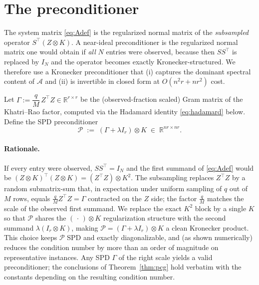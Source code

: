 \documentclass[12pt]{article}
\newcommand{\bR}{\mathbb{R}}
\begin{document}
\section{The preconditioner}\label{sec:precond}

The system matrix \eqref{eq:Adef} is the regularized normal matrix of the
\emph{subsampled} operator $S^{\!\top}(Z\otimes K)$. A near-ideal preconditioner
is the regularized normal matrix one would obtain if \emph{all} $N$ entries were
observed, because then $SS^{\!\top}$ is replaced by $I_N$ and the operator becomes
exactly Kronecker-structured. We therefore use a Kronecker preconditioner that
(i) captures the dominant spectral content of $\mathcal{A}$ and (ii) is invertible
in closed form at $O(n^2r+nr^2)$ cost.

\begin{definition}[Preconditioner]\label{def:prec}
Let $\Gamma:=\dfrac{q}{M}\,Z^{\!\top}Z\in\bR^{r\times r}$ be the (observed-fraction
scaled) Gram matrix of the Khatri--Rao factor, computed via the Hadamard identity
\eqref{eq:hadamard} below. Define the SPD preconditioner
\begin{equation}\label{eq:Pdef}
  \mathcal{P}\;:=\;(\Gamma+\lambda I_r)\otimes K\;\in\;\bR^{nr\times nr}.
\end{equation}
\end{definition}

\paragraph{Rationale.}
If every entry were observed, $SS^{\!\top}=I_N$ and the first summand of
\eqref{eq:Adef} would be $(Z\otimes K)^{\!\top}(Z\otimes K)=(Z^{\!\top}Z)\otimes
K^2$. The subsampling replaces $Z^{\!\top}Z$ by a random submatrix-sum that, in
expectation under uniform sampling of $q$ out of $M$ rows, equals
$\tfrac{q}{M}Z^{\!\top}Z=\Gamma$ contracted on the $Z$ side; the factor
$\tfrac{q}{M}$ matches the scale of the observed first summand. We replace the
exact $K^2$ block by a single $K$ so that $\mathcal{P}$ shares the
$(\,\cdot\,)\otimes K$ regularization structure with the second summand
$\lambda(I_r\otimes K)$, making $\mathcal P=(\Gamma+\lambda I_r)\otimes K$ a clean
Kronecker product. This choice keeps $\mathcal P$ SPD and exactly diagonalizable,
and (as shown numerically) reduces the condition number by more than an order of
magnitude on representative instances. Any SPD $\Gamma$ of the right scale yields
a valid preconditioner; the conclusions of Theorem~\ref{thm:pcg} hold verbatim
with the constants depending on the resulting condition number.
\end{document}
